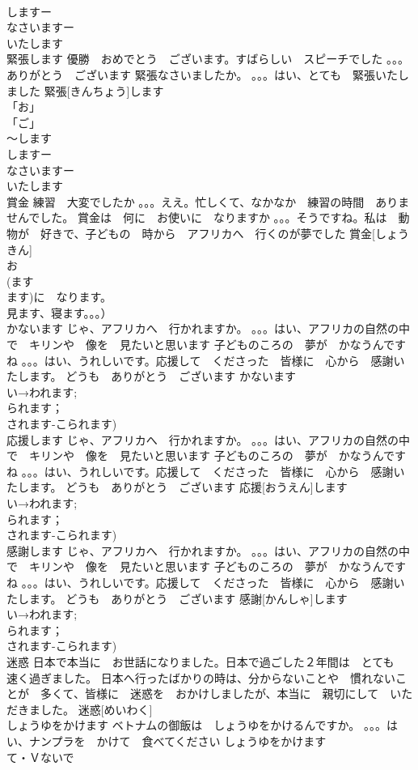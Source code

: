 \documentclass[8pt]{extreport}
\begin{document}
\begin{CJK}{UTF8}{min}
\\	しますー
\\	なさいますー
\\	いたします
\\	緊張します	優勝　おめでとう　ございます。すばらしい　スピーチでした 。。。ありがとう　ございます 緊張なさいましたか。 。。。はい、とても　緊張いたしました	緊張[きんちょう]します			
\\	「お」
\\	「ご」
\\	～します 
\\	しますー
\\	なさいますー
\\	いたします
\\	賞金	練習　大変でしたか 。。。ええ。忙しくて、なかなか　練習の時間　ありませんでした。 賞金は　何に　お使いに　なりますか 。。。そうですね。私は　動物が　好きで、子どもの　時から　アフリカへ　行くのが夢でした	賞金[しょうきん]			
\\	お
\\	(ます
\\	ます)に　なります。
\\	見ます、寝ます。。。）	
\\	かないます	じゃ、アフリカへ　行かれますか。 。。。はい、アフリカの自然の中で　キリンや　像を　見たいと思います 子どものころの　夢が　かなうんですね 。。。はい、うれしいです。応援して　くださった　皆様に　心から　感謝いたします。 どうも　ありがとう　ございます	かないます			
\\	い→われます;
\\	られます；
\\	されます-こられます)
\\	応援します	じゃ、アフリカへ　行かれますか。 。。。はい、アフリカの自然の中で　キリンや　像を　見たいと思います 子どものころの　夢が　かなうんですね 。。。はい、うれしいです。応援して　くださった　皆様に　心から　感謝いたします。 どうも　ありがとう　ございます	応援[おうえん]します			
\\	い→われます;
\\	られます；
\\	されます-こられます)
\\	感謝します	じゃ、アフリカへ　行かれますか。 。。。はい、アフリカの自然の中で　キリンや　像を　見たいと思います 子どものころの　夢が　かなうんですね 。。。はい、うれしいです。応援して　くださった　皆様に　心から　感謝いたします。 どうも　ありがとう　ございます	感謝[かんしゃ]します			
\\	い→われます;
\\	られます；
\\	されます-こられます)
\\	迷惑	日本で本当に　お世話になりました。日本で過ごした２年間は　とても　速く過ぎました。 日本へ行ったばかりの時は、分からないことや　慣れないことが　多くて、皆様に　迷惑を　おかけしましたが、本当に　親切にして　いただきました。	迷惑[めいわく]			
\\	しょうゆをかけます	ベトナムの御飯は　しょうゆをかけるんですか。 。。。はい、ナンプラを　かけて　食べてください	しょうゆをかけます			
\\	て・Ｖないで　
\end{CJK}
\end{document}
